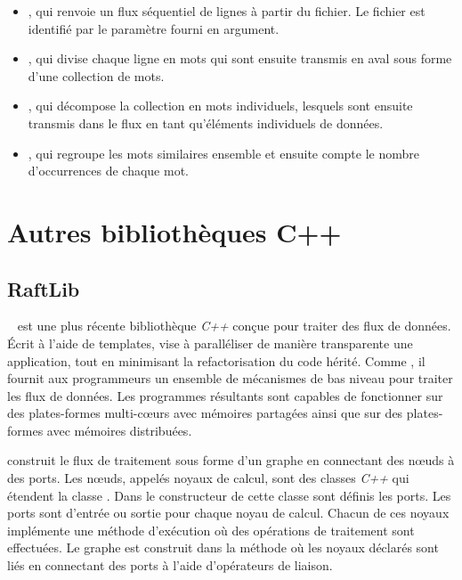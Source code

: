 \begin{itemize}
    \item {}, qui renvoie un flux s\'equentiel de lignes \`a partir du fichier. Le fichier est identifi\'e par le param\`etre  fourni en argument.

    \item {}, qui divise chaque ligne en mots qui sont ensuite transmis en aval sous forme d'une collection de mots.
    
    \item {}, qui décompose la collection en mots individuels, lesquels sont ensuite transmis dans le flux en tant qu'éléments individuels de données.
    
    \item {}, qui regroupe les mots similaires ensemble et ensuite compte le nombre d'occurrences de chaque mot.
    
\end{itemize}

\section{Autres biblioth\`eques C++}    
\subsection{RaftLib} 
~\citep{beard2017raftlib} est une plus r\'ecente biblioth\`eque \emph{C++} con\c{c}ue pour traiter des flux de donn\'ees. \'Ecrit \`a l'aide de templates,  vise \`a parall\'eliser de mani\`ere transparente une application, tout en minimisant la refactorisation du code h\'erit\'e. Comme , il fournit aux programmeurs un ensemble de m\'ecanismes de bas niveau pour traiter les flux de donn\'ees. Les programmes r\'esultants sont capables de fonctionner sur des plates-formes multi-cœurs avec m\'emoires partag\'ees ainsi que sur des plates-formes avec m\'emoires distribu\'ees.



 construit le flux de traitement sous forme d'un graphe en connectant des nœuds à des ports. Les nœuds, appel\'es noyaux de calcul, sont des classes \emph{C++} qui \'etendent la classe . Dans le constructeur de cette classe sont d\'efinis les ports. Les ports sont d'entrée ou sortie pour chaque noyau de calcul. Chacun de ces noyaux impl\'emente une m\'ethode d'ex\'ecution o\`u des op\'erations de traitement sont effectu\'ees. Le graphe est construit dans la m\'ethode  o\`u les noyaux d\'eclar\'es sont li\'es en connectant des ports \`a l'aide d'op\'erateurs de liaison. 

